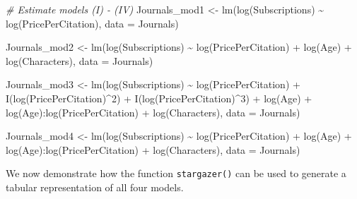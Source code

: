\documentclass[
]{article}
\newenvironment{Shaded}{\begin{snugshade}}{\end{snugshade}}
\newcommand{\AttributeTok}[1]{\textcolor[rgb]{0.77,0.63,0.00}{#1}}
\newcommand{\CommentTok}[1]{\textcolor[rgb]{0.56,0.35,0.01}{\textit{#1}}}
\newcommand{\DecValTok}[1]{\textcolor[rgb]{0.00,0.00,0.81}{#1}}
\newcommand{\FunctionTok}[1]{\textcolor[rgb]{0.00,0.00,0.00}{#1}}
\newcommand{\NormalTok}[1]{#1}
\newcommand{\OtherTok}[1]{\textcolor[rgb]{0.56,0.35,0.01}{#1}}
\newcommand{\SpecialCharTok}[1]{\textcolor[rgb]{0.00,0.00,0.00}{#1}}
\begin{document}
\begin{Shaded}
\begin{Highlighting}[]
\CommentTok{\# Estimate models (I) {-} (IV)}
\NormalTok{Journals\_mod1 }\OtherTok{\textless{}{-}} \FunctionTok{lm}\NormalTok{(}\FunctionTok{log}\NormalTok{(Subscriptions) }\SpecialCharTok{\textasciitilde{}} \FunctionTok{log}\NormalTok{(PricePerCitation), }
                    \AttributeTok{data =}\NormalTok{ Journals)}

\NormalTok{Journals\_mod2 }\OtherTok{\textless{}{-}} \FunctionTok{lm}\NormalTok{(}\FunctionTok{log}\NormalTok{(Subscriptions) }\SpecialCharTok{\textasciitilde{}} \FunctionTok{log}\NormalTok{(PricePerCitation) }
                    \SpecialCharTok{+} \FunctionTok{log}\NormalTok{(Age) }\SpecialCharTok{+} \FunctionTok{log}\NormalTok{(Characters), }
                    \AttributeTok{data =}\NormalTok{ Journals)}

\NormalTok{Journals\_mod3 }\OtherTok{\textless{}{-}} \FunctionTok{lm}\NormalTok{(}\FunctionTok{log}\NormalTok{(Subscriptions) }\SpecialCharTok{\textasciitilde{}} 
                    \FunctionTok{log}\NormalTok{(PricePerCitation) }\SpecialCharTok{+} \FunctionTok{I}\NormalTok{(}\FunctionTok{log}\NormalTok{(PricePerCitation)}\SpecialCharTok{\^{}}\DecValTok{2}\NormalTok{) }
                    \SpecialCharTok{+} \FunctionTok{I}\NormalTok{(}\FunctionTok{log}\NormalTok{(PricePerCitation)}\SpecialCharTok{\^{}}\DecValTok{3}\NormalTok{) }\SpecialCharTok{+} \FunctionTok{log}\NormalTok{(Age) }
                    \SpecialCharTok{+} \FunctionTok{log}\NormalTok{(Age)}\SpecialCharTok{:}\FunctionTok{log}\NormalTok{(PricePerCitation) }\SpecialCharTok{+} \FunctionTok{log}\NormalTok{(Characters), }
                    \AttributeTok{data =}\NormalTok{ Journals)}

\NormalTok{Journals\_mod4 }\OtherTok{\textless{}{-}} \FunctionTok{lm}\NormalTok{(}\FunctionTok{log}\NormalTok{(Subscriptions) }\SpecialCharTok{\textasciitilde{}} 
                    \FunctionTok{log}\NormalTok{(PricePerCitation) }\SpecialCharTok{+} \FunctionTok{log}\NormalTok{(Age) }
                    \SpecialCharTok{+} \FunctionTok{log}\NormalTok{(Age)}\SpecialCharTok{:}\FunctionTok{log}\NormalTok{(PricePerCitation) }\SpecialCharTok{+} 
                    \FunctionTok{log}\NormalTok{(Characters), }
                    \AttributeTok{data =}\NormalTok{ Journals)}
\end{Highlighting}
\end{Shaded}

We now demonstrate how the function \texttt{stargazer()} can be used to
generate a tabular representation of all four models.
\end{document}
